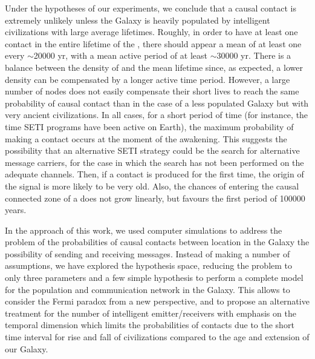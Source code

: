 \documentclass[crop]{CSLB}
\begin{document}
Under the hypotheses of our experiments, we conclude that a causal
contact is extremely unlikely unless the Galaxy is heavily populated
by intelligent civilizations with large average lifetimes.
%
Roughly, in order to have at least one contact in the entire lifetime of the
\ceti{}, there should appear a mean of at least one \ceti{} every $\sim$20000 yr, with
a mean active period of at least $\sim$30000 yr.
%
There is a balance between the density of \cetis{} and the mean
lifetime since, as expected, a lower density can be compensated by a
longer active time period.
%
However, a large number of nodes does not easily compensate their
short lives 
to reach the same probability of causal contact than in the case of a
less populated Galaxy but with very ancient civilizations.
%
In all cases, for a short period of time (for instance, the time SETI
programs have been active on Earth), the maximum probability of making
a contact occurs at the moment of the awakening.
%
This suggests the possibility that an alternative SETI strategy could be
the search for alternative message carriers, for the case in which the
search has not been performed on the adequate channels.
%
Then, if a contact is produced for the first time, the origin of the
signal is more likely to be very old.
%
Also, the chances of entering the causal connected zone of a \ceti{}
does not grow linearly, but favours the first period of 100000 years.


In the approach of this work, we used computer simulations to address
the problem of the probabilities of causal contacts between location
in the Galaxy the possibility of sending and receiving messages.
%
Instead of making a number of assumptions, we have explored the
hypothesis space, reducing the problem to only three parameters and a
few simple hypothesis to perform a complete model for the population and
communication network in the Galaxy.
%
This allows to consider the Fermi paradox from a new perspective, and
to propose an alternative treatment for the number of intelligent
emitter/receivers with emphasis on the temporal dimension which limits
the probabilities of contacts due to the short time interval for
rise and fall of civilizations compared to the age and extension of
our Galaxy.









\setlength{\bibsep}{0.0pt}


\end{document}
